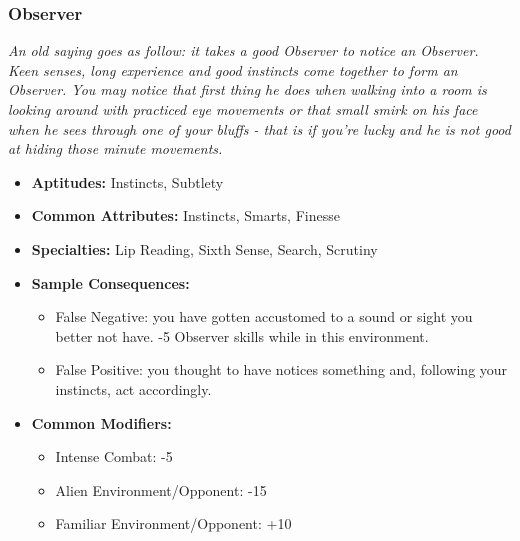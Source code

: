  \subsubsection{Observer}\label{Observer}
 \textit{An old saying goes as follow: it takes a good Observer to notice an Observer.
Keen senses, long experience and good instincts come together to form an Observer.
You may notice that first thing he does when walking into a room is looking around with practiced eye movements or that small smirk on his face when he sees through one of your bluffs - that is if you're lucky and he is not good at hiding those minute movements.}
 \begin{itemize}
 	\item \textbf{Aptitudes:} Instincts, Subtlety
 	\item \textbf{Common Attributes:} Instincts, Smarts, Finesse
 	\item \textbf{Specialties:} Lip Reading, Sixth Sense, Search, Scrutiny
 	\item \textbf{Sample Consequences:} 
 	\begin{itemize}
 		\item False Negative: you have gotten accustomed to a sound or sight you better not have. -5 Observer skills while in this environment.
 		\item False Positive: you thought to have notices something and, following your instincts, act accordingly.
 	\end{itemize}
 	\item \textbf{Common Modifiers:}
 	\begin{itemize}
 		\item Intense Combat: -5
 		\item Alien Environment/Opponent: -15
 		\item Familiar Environment/Opponent: +10
 	\end{itemize}
 \end{itemize}

